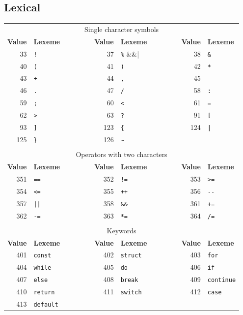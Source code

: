 \documentclass{article}
\begin{document}
	\subsection{Lexical}\label{subsec:lexical}
	\begin{table}[t]
		\centering
		\begin{tabular}{rlcrlcrl}
			\multicolumn{8}{c}{Single character symbols}
			\\[1mm]
			{\bf Value} & {\bf Lexeme}
			& ~~~~~~ &
				{\bf Value} & {\bf Lexeme}
			& ~~~~~~ &
				{\bf Value} & {\bf Lexeme}
			\\ \cline{1-2} \cline{4-5} \cline{7-8}
			33 & \verb|!| &&
			37 & \verb|%| &&
			38 & \verb|&| \\
			40 & \verb|(| &&
			41 & \verb|)| &&
			42 & \verb|*| \\
			43 & \verb|+| &&
			44 & \verb|,| &&
			45 & \verb|-| \\
			46 & \verb|.| &&
			47 & \verb|/| &&
			58 & \verb|:| \\
			59 & \verb|;| &&
			60 & \verb|<| &&
			61 & \verb|=| \\
			62 & \verb|>| &&
			63 & \verb|?| &&
			91 & \verb|[| \\
			93 & \verb|]| &&
			123 & \verb|{| &&
			124 & \verb+|+ \\
			125 & \verb|}| &&
			126 & \verb|~| \\
			\\
			\multicolumn{8}{c}{Operators with two characters}
			\\[1mm]
			{\bf Value} & {\bf Lexeme}
			& ~~~~~~ &
				{\bf Value} & {\bf Lexeme}
			& ~~~~~~ &
				{\bf Value} & {\bf Lexeme}
			\\ \cline{1-2} \cline{4-5} \cline{7-8}
			351 & \verb|==| &&
			352 & \verb|!=| &&
			353 & \verb|>=| \\
			354 & \verb|<=| &&
			355 & \verb|++| &&
			356 & \verb|--| \\
			357 & \verb+||+ &&
			358 & \verb|&&| &&
			361 & \verb|+=| \\
			362 & \verb|-=| &&
			363 & \verb|*=| &&
			364 & \verb|/=| \\
			\\
			\multicolumn{8}{c}{Keywords}
			\\[1mm]
			{\bf Value} & {\bf Lexeme}
			& ~~~~~~ &
				{\bf Value} & {\bf Lexeme}
			& ~~~~~~ &
				{\bf Value} & {\bf Lexeme}
			\\ \cline{1-2} \cline{4-5} \cline{7-8}
			401 & \verb|const| &&
			402 & \verb|struct| &&
			403 & \verb|for| \\
			404 & \verb|while| &&
			405 & \verb|do| &&
			406 & \verb|if| \\
			407 & \verb|else| &&
			408 & \verb|break| &&
			409 & \verb|continue| \\
			410 & \verb|return| &&
			411 & \verb|switch| &&
			412 & \verb|case| \\
			413 & \verb|default| \\
		\end{tabular}


\end{table}
\end{document}

